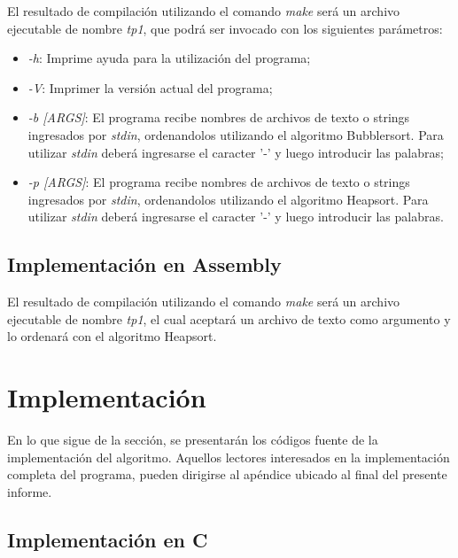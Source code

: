 \documentclass{article}
\begin{document}
	El resultado de compilación utilizando el comando \textit{make} será un archivo ejecutable de nombre \textit{tp1}, que podrá ser invocado con los siguientes parámetros:
	\medskip

	\begin{itemize}

		\itemsep=2pt \topsep=0pt \partopsep=0pt \parskip=0pt \parsep=0pt
			\item \textit{-h}:  Imprime ayuda para la utilización del programa;
			\item \textit{-V}:  Imprimer la versión actual del programa;
			\item \textit{-b [ARGS]}:  El programa recibe nombres de archivos de texto o strings ingresados por \textit{stdin}, ordenandolos utilizando el algoritmo Bubblersort. Para utilizar \textit{stdin} deberá ingresarse el caracter '-' y luego introducir las palabras;
			\item \textit{-p [ARGS]}:  El programa recibe nombres de archivos de texto o strings ingresados por \textit{stdin}, ordenandolos utilizando el algoritmo Heapsort. Para utilizar \textit{stdin} deberá ingresarse el caracter '-' y luego introducir las palabras.

	\end{itemize}	
	\medskip



\subsection{Implementación en Assembly}

	El resultado de compilación utilizando el comando \textit{make} será un archivo ejecutable de nombre \textit{tp1}, el cual aceptará un archivo de texto como argumento y lo ordenará con el algoritmo Heapsort.
\medskip




\section{Implementación}
	
	En lo que sigue de la sección, se presentarán los códigos fuente de la implementación del algoritmo. Aquellos lectores interesados en la implementación completa del programa, pueden dirigirse al apéndice ubicado al final del presente informe.
\bigskip



\subsection{Implementación en C}
\end{document}
